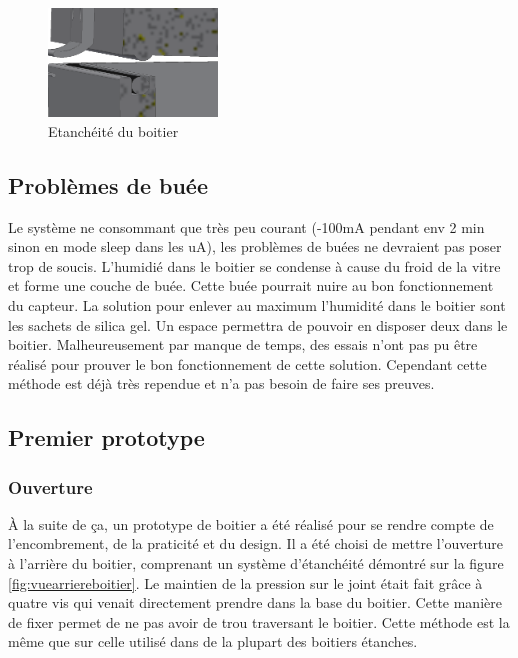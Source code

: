 \begin{figure}[H]
    \centering
    \includegraphics[width=0.4\textwidth]{Images/photos_PGA/EtanchBoitier.PNG}
    \caption{Etanchéité du boitier}
    \label{fig:etanche}
\end{figure}

\subsection{Problèmes de buée}

Le système ne consommant que très peu courant (-100mA pendant env 2 min sinon en mode sleep dans les uA), 
les problèmes de buées ne devraient pas poser trop de soucis. L’humidié dans le boitier se condense à cause 
du froid de la vitre et forme une couche de buée. Cette buée pourrait nuire au bon fonctionnement du capteur. 
La solution pour enlever au maximum l’humidité dans le boitier sont les sachets de silica gel. Un espace 
permettra de pouvoir en disposer deux dans le boitier. 
Malheureusement par manque de temps, des essais n’ont pas pu être réalisé pour prouver le bon fonctionnement 
de cette solution. Cependant cette méthode est déjà très rependue et n’a pas besoin de faire ses preuves.

\subsection{Premier prototype}

\subsubsection{Ouverture}

À la suite de ça, un prototype de boitier a été réalisé pour se rendre compte de l’encombrement, de la 
praticité et du design. Il a été choisi de mettre l'ouverture à l’arrière du boitier, comprenant un
système d’étanchéité démontré sur la figure \ref{fig:vuearriereboitier}. Le maintien de la pression 
sur le joint était fait grâce à quatre vis qui venait directement prendre dans la base du boitier. 
Cette manière de fixer permet de ne pas avoir de trou traversant le boitier. Cette méthode est la 
même que sur celle utilisé dans de la plupart des boitiers étanches.


